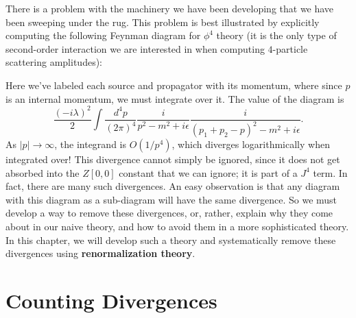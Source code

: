 \documentclass{report}
\theoremstyle{plain}
\theoremstyle{definition}
\theoremstyle{remark}
\begin{document}
There is a problem with the machinery we have been developing that we
have been sweeping under the rug. This problem is best illustrated by
explicitly computing the following Feynman diagram for $\phi^4$ theory
(it is the only type of second-order interaction we are interested in
when computing $4$-particle scattering amplitudes):
\begin{center}
\end{center}
Here we've labeled each source and propagator with its momentum, where
since $p$ is an internal momentum, we must integrate over it. The
value of the diagram is
$$ \frac{(-i\lambda)^2}{2} \int \frac{d^4p}{(2\pi)^4} \frac{i}{p^2 - m^2 + i\epsilon} \frac{i}{(p_1 + p_2 - p)^2 - m^2 + i\epsilon}. $$
As $|p| \to \infty$, the integrand is $O(1/p^4)$, which diverges
logarithmically when integrated over! This divergence cannot simply be
ignored, since it does not get absorbed into the $Z[0,0]$ constant
that we can ignore; it is part of a $J^4$ term. In fact, there are
many such divergences. An easy observation is that any diagram with
this diagram as a sub-diagram will have the same divergence. So we
must develop a way to remove these divergences, or, rather, explain
why they come about in our naive theory, and how to avoid them in a
more sophisticated theory. In this chapter, we will develop such a
theory and systematically remove these divergences using {\bf
  renormalization theory}.

\section{Counting Divergences}
\end{document}

